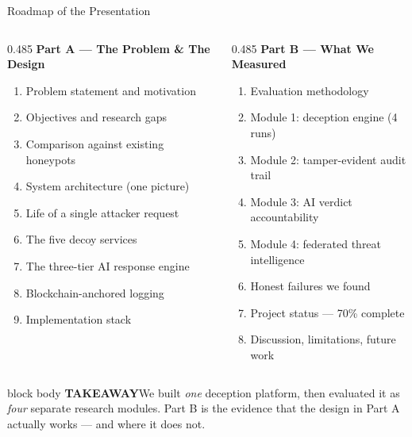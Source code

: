 \documentclass[aspectratio=169,11pt]{beamer}
\newcommand{\takeaway}[1]{%
  \vspace{3pt}%
  \begin{beamercolorbox}[wd=\dimexpr\textwidth-10pt\relax,sep=5pt,rounded=true]{block body}%
    {\color{navy}\bfseries\scriptsize TAKEAWAY\;\;}{\scriptsize #1}%
  \end{beamercolorbox}}
\begin{document}
\begin{frame}{Roadmap of the Presentation}
  \vspace{-2pt}
  \begin{columns}[T,onlytextwidth]
    \begin{column}{0.485\textwidth}
      \footnotesize
      \textbf{\color{navy}Part A --- The Problem \& The Design}\\[2pt]
      \begin{enumerate}\setlength\itemsep{0.8pt}
        \item Problem statement and motivation
        \item Objectives and research gaps
        \item Comparison against existing honeypots
        \item System architecture (one picture)
        \item Life of a single attacker request
        \item The five decoy services
        \item The three-tier AI response engine
        \item Blockchain-anchored logging
        \item Implementation stack
      \end{enumerate}
    \end{column}
    \begin{column}{0.485\textwidth}
      \footnotesize
      \textbf{\color{navy}Part B --- What We Measured}\\[2pt]
      \begin{enumerate}\setlength\itemsep{0.8pt}\setcounter{enumi}{9}
        \item Evaluation methodology
        \item Module 1: deception engine (4 runs)
        \item Module 2: tamper-evident audit trail
        \item Module 3: AI verdict accountability
        \item Module 4: federated threat intelligence
        \item Honest failures we found
        \item Project status --- 70\% complete
        \item Discussion, limitations, future work
      \end{enumerate}
    \end{column}
  \end{columns}
  \takeaway{We built \emph{one} deception platform, then evaluated it as \emph{four} separate research modules. Part B is the evidence that the design in Part A actually works --- and where it does not.}
\end{frame}
\end{document}
